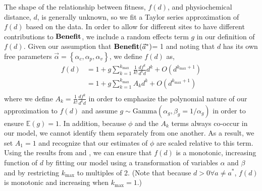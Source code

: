 \documentclass{article}
\newcommand{\EE}{\mathbb{E}} %
\newcommand{\Funcaoptvec}{\ensuremath{\Func(\aoptvec)}\xspace}
\newcommand{\Func}{\ensuremath{\text{\textbf{Benefit}}}\xspace}
\newcommand{\alphac}{\ensuremath{\alpha_c}\xspace}
\newcommand{\alphap}{\ensuremath{\alpha_p}\xspace}
\newcommand{\alphavec}{\ensuremath{\Vec{\alpha}}\xspace}
\newcommand{\alphav}{\ensuremath{\alpha_v}\xspace}
\newcommand{\aoptvec}{\ensuremath{\Vec{a}^*}\xspace}
\newcommand{\aopt}{\ensuremath{a^*}\xspace}
\newcommand{\kmax}{\ensuremath{{k_{\max}}}\xspace}
\begin{document}
\begin{itemize}
The shape of the relationship between fitness, $f(d)$, and physiochemical distance, $d$, is generally unknown, so  we fit a Taylor series approximation of  $f(d)$ based on the data.
In order to allow for different sites to have different contributions to \Func, we include a random effects term $g$ in our definition of $f(d)$.
Given our assumption that \Funcaoptvec = 1 and noting that $d$ has its own free parameters $\alphavec  = \left\{\alphac, \alphap, \alphav\right\}$, we define $f(d)$ as,
\begin{align}
  \label{eq:fSeriesDef}
  f(d) &= 1 + g \sum_{k=1}^\kmax \frac{1}{k!}\frac{d f^k}{d^k d} d^k + O(d^{\kmax+1})\\
  & = 1 + g \sum_{k=1}^\kmax A_k d^k + O(d^{\kmax+1})\\
\end{align}
where we define $A_k = \frac{1}{k!}\frac{d f^k}{d^k d}$ in order to emphasize the polynomial nature of our approximation to $f(d)$ and assume $g \sim \text{Gamma}\left(\alpha_g, \beta_g = 1/\alpha_g\right)$ in order to ensure $\EE(g) = 1$.
In addition, because $\phi$ and the $A_k$ terms always co-occur in our model, we cannot identify them separately from one another.
As a result, we set $A_1 = 1$ and recognize that our estimates of $\phi$ are scaled relative to this term.
Using the results from \citet{Liang07} and \citet{Elphinstone85}, we can ensure that $f(d)$ is a monotonic, increasing function of $d$ by fitting our model using a transformation of variables $\alpha$ and $\beta$ and by restricting \kmax to multiples of 2. (Note that because $d > 0 \forall a \neq \aopt$, $f(d)$ is monotonic and increasing when $\kmax=1$.)


\end{itemize}
\end{document}
